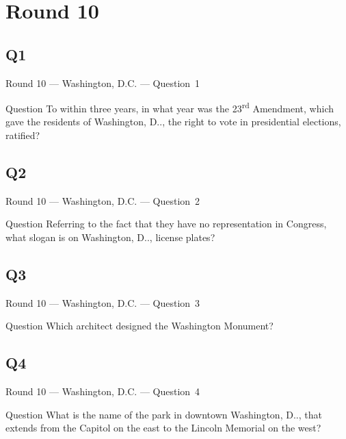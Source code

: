 \documentclass[11pt]{beamer}
\begin{document}
\section{Round 10}
\subsection*{Q1}
\begin{frame}[t]{Round 10 --- Washington, D.C. --- \mbox{Question 1}}
\vspace{-0.5em}
\begin{block}{Question}
To within three years, in what year was the 23\textsuperscript{rd} Amendment, which gave the residents of Washington, D.\@C.\@, the right to vote in presidential elections, ratified?
\end{block}
\end{frame}
\subsection*{Q2}
\begin{frame}[t]{Round 10 --- Washington, D.C. --- \mbox{Question 2}}
\vspace{-0.5em}
\begin{block}{Question}
Referring to the fact that they have no representation in Congress, what slogan is on Washington, D.\@C.\@, license plates?
\end{block}
\end{frame}
\subsection*{Q3}
\begin{frame}[t]{Round 10 --- Washington, D.C. --- \mbox{Question 3}}
\vspace{-0.5em}
\begin{block}{Question}
Which architect designed the Washington Monument?
\end{block}
\end{frame}
\subsection*{Q4}
\begin{frame}[t]{Round 10 --- Washington, D.C. --- \mbox{Question 4}}
\vspace{-0.5em}
\begin{block}{Question}
What is the name of the park in downtown Washington, D.\@C.\@, that extends from the Capitol on the east to the Lincoln Memorial on the west?
\end{block}
\end{frame}
\end{document}
